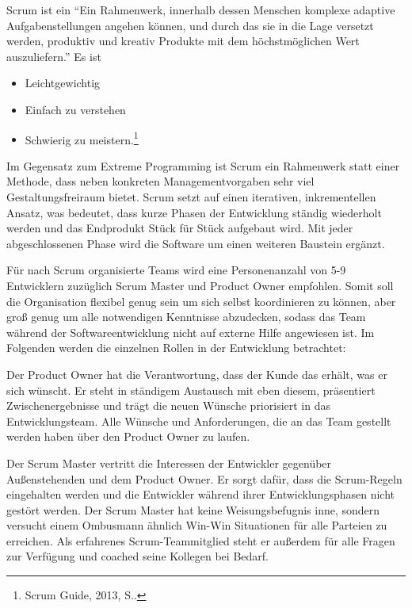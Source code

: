                   Scrum ist ein \enquote{Ein Rahmenwerk, innerhalb dessen Menschen komplexe adaptive Aufgabenstellungen angehen können, und durch das sie in die Lage versetzt werden, produktiv und kreativ Produkte mit dem höchstmöglichen Wert auszuliefern.} Es ist
                  \begin{itemize}
                      \item Leichtgewichtig
                      \item Einfach zu verstehen
                      \item Schwierig zu meistern.\footnote{Scrum Guide, 2013, S..}
                  \end{itemize}

                  Im Gegensatz zum Extreme Programming ist Scrum ein Rahmenwerk statt einer Methode, dass neben konkreten Managementvorgaben sehr viel Gestaltungsfreiraum bietet. Scrum setzt auf einen iterativen, inkrementellen Ansatz, was bedeutet, dass kurze Phasen der Entwicklung ständig wiederholt werden und das Endprodukt Stück für Stück aufgebaut wird. Mit jeder abgeschlossenen Phase wird die Software um einen weiteren Baustein ergänzt.

                  Für nach Scrum organisierte Teams wird eine Personenanzahl von 5-9 Entwicklern zuzüglich Scrum Master und Product Owner empfohlen. Somit soll die Organisation flexibel genug sein um sich selbst koordinieren zu können, aber groß genug um alle notwendigen Kenntnisse abzudecken, sodass das Team während der Softwareentwicklung nicht auf externe Hilfe angewiesen ist. Im Folgenden werden die einzelnen Rollen in der Entwicklung betrachtet:

                  Der Product Owner hat die Verantwortung, dass der Kunde das erhält, was er sich wünscht. Er steht in ständigem Austausch mit eben diesem, präsentiert Zwischenergebnisse und trägt die neuen Wünsche priorisiert in das Entwicklungsteam. Alle Wünsche und Anforderungen, die an das Team gestellt werden haben über den Product Owner zu laufen.

                  Der Scrum Master vertritt die Interessen der Entwickler gegenüber Außenstehenden und dem Product Owner. Er sorgt dafür, dass die Scrum-Regeln eingehalten werden und die Entwickler während ihrer Entwicklungsphasen nicht gestört werden. Der Scrum Master hat keine Weisungsbefugnis inne, sondern versucht einem Ombusmann ähnlich Win-Win Situationen für alle Parteien zu erreichen. Als erfahrenes Scrum-Teammitglied steht er außerdem für alle Fragen zur Verfügung und coached seine Kollegen bei Bedarf.

